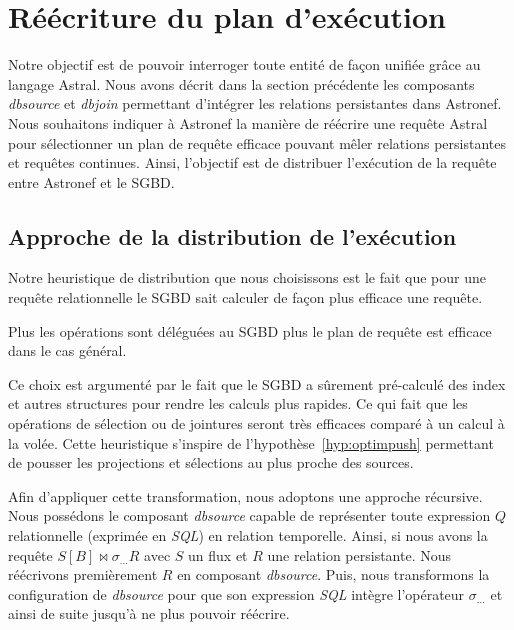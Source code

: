 \section{Réécriture du plan d'exécution}\label{sec:contrib:asteroid:reecriture}
Notre objectif est de pouvoir interroger toute entité de façon unifiée grâce au langage Astral. Nous avons décrit dans la section précédente les composants \textit{dbsource} et \textit{dbjoin} permettant d'intégrer les relations persistantes dans Astronef. Nous souhaitons indiquer à Astronef la manière de réécrire une requête Astral pour sélectionner un plan de requête efficace pouvant mêler relations persistantes et requêtes continues. Ainsi, l'objectif est de distribuer l'exécution de la requête entre Astronef et le SGBD.

\subsection{Approche de la distribution de l'exécution}
Notre heuristique de distribution que nous choisissons est le fait que pour une requête relationnelle le SGBD sait calculer de façon plus efficace une requête.

\begin{hyp}\label{hyp:sgbd}
    Plus les opérations sont déléguées au SGBD plus le plan de requête est efficace dans le cas général.
\end{hyp}

Ce choix est argumenté par le fait que le SGBD a sûrement pré-calculé des index et autres structures pour rendre les calculs plus rapides. Ce qui fait que les opérations de sélection ou de jointures seront très efficaces comparé à un calcul à la volée. Cette heuristique s'inspire de l'hypothèse~\ref{hyp:optimpush} permettant de pousser les projections et sélections au plus proche des sources.

Afin d'appliquer cette transformation, nous adoptons une approche récursive. Nous possédons le composant \textit{dbsource} capable de représenter toute expression $Q$ relationnelle (exprimée en \textit{SQL}) en relation temporelle. Ainsi, si nous avons la requête $S[B] \Join \sigma_{...} R$ avec $S$ un flux et $R$ une relation persistante. Nous réécrivons premièrement $R$ en composant \textit{dbsource}. Puis, nous transformons la configuration de \textit{dbsource} pour que son expression \textit{SQL} intègre l'opérateur $\sigma_{...}$ et ainsi de suite jusqu'à ne plus pouvoir réécrire.


